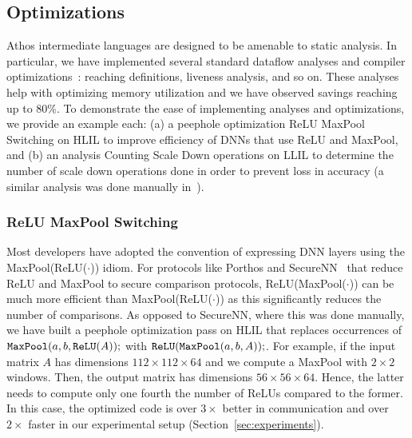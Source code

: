 \subsection{Optimizations}
\label{sec:athosopt}
Athos intermediate languages are designed to be amenable to static analysis. 
In particular, we have implemented several standard dataflow analyses and compiler optimizations~\cite{dragonbook}:
reaching definitions, liveness analysis, and so on. These analyses help with
optimizing memory utilization and we have observed
savings reaching up to 80\%. 
To demonstrate the ease of implementing analyses and optimizations, we provide an example each:
(a) a peephole optimization ReLU MaxPool Switching on HLIL to improve
efficiency of DNNs that use ReLU and MaxPool, and (b) an analysis
Counting Scale Down operations on LLIL to determine the number of scale
down operations done in order to prevent loss in
accuracy (a similar analysis was done manually in~\cite{secureml,securenn,aby3}).

\subsubsection{ReLU MaxPool Switching}
Most \tensorflow
developers have adopted the convention of expressing DNN layers using the MaxPool(ReLU($\cdot$)) idiom.
For protocols like Porthos and SecureNN~\cite{securenn} that reduce ReLU and MaxPool to secure comparison protocols, ReLU(MaxPool($\cdot$)) can be much more efficient than  MaxPool(ReLU($\cdot$))  as this significantly reduces the number of comparisons. As opposed to SecureNN, where this was done manually, we have built a peephole optimization pass on HLIL
that replaces occurrences of ${\mathtt{MaxPool}}(a,b, {\mathtt{ReLU}}(A));$ with ${\mathtt{ReLU}}({\mathtt{MaxPool}}(a,b,A));$. For example,
if the input matrix $A$ has dimensions $112\times112\times64$ and we compute a MaxPool with $2\times2$ windows.
Then, the output matrix has dimensions $56\times56\times 64$. Hence, the latter needs to compute only one fourth the number of ReLUs
compared to the former. In this case, the optimized code is over $3\times$ better in communication and over $2\times$ faster in our experimental setup (Section~\ref{sec:experiments}).
